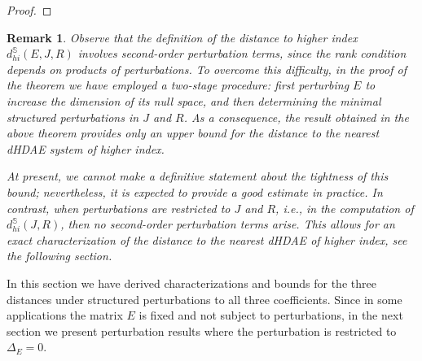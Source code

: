 \documentclass[11pt]{article}
\newtheorem{remark}[theorem]{Remark}
\begin{document}
\begin{proof}
\end{proof}
%

\begin{remark}{\rm
    Observe that the definition of the distance to higher index $d_{hi}^{\mathbb S}(E,J,R)$ involves second-order perturbation terms, since the rank condition depends on products of perturbations. To overcome this difficulty, in the proof of the theorem we have employed a two-stage  procedure: first perturbing $E$ to increase the dimension of its null space, and then determining the minimal structured perturbations in $J$ and $R$. As a consequence, the result obtained in the above theorem provides only an upper bound for the distance to the nearest dHDAE system of higher index.

    At present, we cannot make a definitive statement about the tightness of this bound; nevertheless, it is expected to provide a good estimate in practice. In contrast, when perturbations are restricted to $J$ and $R$, i.e., in the computation of $d_{hi}^{\mathbb S}(J,R)$, then no second-order perturbation terms arise. This allows for an exact characterization of the distance to the nearest dHDAE of higher index, see the following section.
    }
\end{remark}

In this section we have derived characterizations and bounds for the three distances under structured perturbations to all three coefficients. Since in some applications the matrix $E$ is fixed and not subject to perturbations, in the next section we present perturbation results where the perturbation is restricted  to $\Delta_E=0$.
\end{document}
